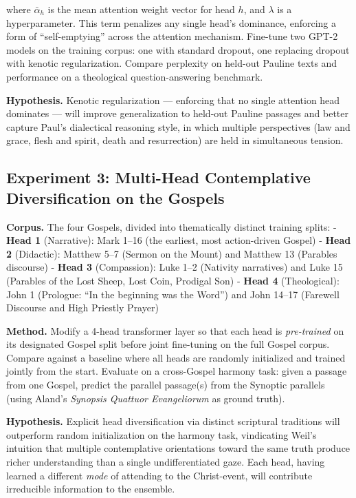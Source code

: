 \documentclass[10pt, letterpaper, twocolumn]{article}
\begin{document}
where \(\bar{\alpha}_h\) is the mean attention weight vector for head \(h\), and \(\lambda\) is a hyperparameter. This term penalizes any single head's dominance, enforcing a form of ``self-emptying'' across the attention mechanism. Fine-tune two GPT-2 models on the training corpus: one with standard dropout, one replacing dropout with kenotic regularization. Compare perplexity on held-out Pauline texts and performance on a theological question-answering benchmark.

\textbf{Hypothesis.} Kenotic regularization --- enforcing that no single attention head dominates --- will improve generalization to held-out Pauline passages and better capture Paul's dialectical reasoning style, in which multiple perspectives (law and grace, flesh and spirit, death and resurrection) are held in simultaneous tension.

\subsection*{Experiment 3: Multi-Head Contemplative Diversification on the Gospels}\label{experiment-3-multi-head-contemplative-diversification-on-the-gospels}

\textbf{Corpus.} The four Gospels, divided into thematically distinct training splits: - \textbf{Head 1} (Narrative): Mark 1--16 (the earliest, most action-driven Gospel) - \textbf{Head 2} (Didactic): Matthew 5--7 (Sermon on the Mount) and Matthew 13 (Parables discourse) - \textbf{Head 3} (Compassion): Luke 1--2 (Nativity narratives) and Luke 15 (Parables of the Lost Sheep, Lost Coin, Prodigal Son) - \textbf{Head 4} (Theological): John 1 (Prologue: ``In the beginning was the Word'') and John 14--17 (Farewell Discourse and High Priestly Prayer)

\textbf{Method.} Modify a 4-head transformer layer so that each head is \emph{pre-trained} on its designated Gospel split before joint fine-tuning on the full Gospel corpus. Compare against a baseline where all heads are randomly initialized and trained jointly from the start. Evaluate on a cross-Gospel harmony task: given a passage from one Gospel, predict the parallel passage(s) from the Synoptic parallels (using Aland's \emph{Synopsis Quattuor Evangeliorum} as ground truth).

\textbf{Hypothesis.} Explicit head diversification via distinct scriptural traditions will outperform random initialization on the harmony task, vindicating Weil's intuition that multiple contemplative orientations toward the same truth produce richer understanding than a single undifferentiated gaze. Each head, having learned a different \emph{mode} of attending to the Christ-event, will contribute irreducible information to the ensemble.
\end{document}
